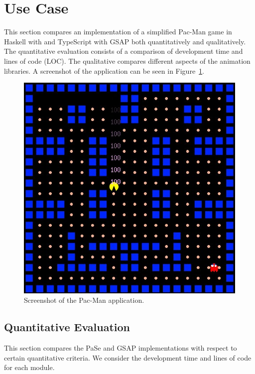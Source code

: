 \section{Use Case}

This section compares an implementation of a simplified Pac-Man game in Haskell with \dsl{} and TypeScript with GSAP both quantitatively and qualitatively. The quantitative evaluation consists of a comparison of development time and lines of code (LOC). The qualitative compares different aspects of the animation libraries. A screenshot of the application can be seen in Figure~\ref{fig:pacman}.

\begin{figure}[h]{\textwidth}
\centering
\includegraphics[width=.3\textwidth]{pictures/pacman}
\caption{Screenshot of the Pac-Man application.}
\label{fig:pacman}
\end{figure}

\subsection{Quantitative Evaluation}

This section compares the PaSe and GSAP implementations with respect to certain quantitative criteria. We consider the development time and lines of code for each module.

